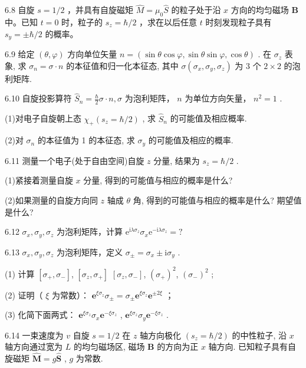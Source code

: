 6.8 自旋 $s = 1 / 2$ ，并具有自旋磁矩 $\hat{M} = \mu_0\hat{S}$ 的粒子处于沿 $x$ 方向的均匀磁场 $\pmb{B}$ 中。已知 $t = 0$ 时，粒子的 $s_z = \hbar / 2$ ，求在以后任意 $t$ 时刻发现粒子具有 $s_y = \pm \hbar / 2$ 的概率。
\vfill\newpage

6.9 给定 $(\theta, \varphi)$ 方向单位矢量 $n = (\sin \theta \cos \varphi, \sin \theta \sin \varphi, \cos \theta)$ . 在 $\sigma_z$ 表象, 求 $\sigma_n = \sigma \cdot n$ 的本征值和归一化本征态, 其中 $\sigma(\sigma_x, \sigma_y, \sigma_z)$ 为 3 个 $2 \times 2$ 的泡利矩阵.
\vfill\newpage

6.10 自旋投影算符 $\hat{S}_n = \frac{\hbar}{2}\sigma \cdot n, \sigma$ 为泡利矩阵， $n$ 为单位方向矢量， $n^2 = 1$ .

(1)对电子自旋朝上态 $\chi_{+}(s_{z} = \hbar /2)$ , 求 $\hat{S}_n$ 的可能值及相应概率. 

(2)对 $\sigma_{n}$ 的本征值为 1 的本征态, 求 $\sigma_{y}$ 的可能值及相应的概率.
\vfill\newpage

6.11 测量一个电子(处于自由空间)自旋 $z$ 分量, 结果为 $s_z = \hbar / 2$ . 

(1)紧接着测量自旋 $x$ 分量, 得到的可能值与相应的概率是什么? 

(2)如果测量的自旋方向同 $z$ 轴成 $\theta$ 角, 得到的可能值与相应的概率是什么? 期望值是什么?

\vfill\newpage

6.12 $\sigma_{x},\sigma_{y},\sigma_{z}$ 为泡利矩阵，计算 $\mathrm{e}^{\mathrm{i}\lambda \sigma_z}\sigma_x\mathrm{e}^{-\mathrm{i}\lambda \sigma_z} = ?$

\vfill\newpage

6.13 $\sigma_{x},\sigma_{y},\sigma_{z}$ 为泡利矩阵，定义 $\sigma_{\pm} = \sigma_{x}\pm \mathrm{i}\sigma_{y}$ .

(1) 计算 $[\sigma_+, \sigma_-]$, $[\sigma_z, \sigma_+]$ $\left[\sigma_z,\sigma_-\right]$, $(\sigma_+) ^2$, $(\sigma_-)^2$ ; 

(2) 证明（ $\xi$ 为常数）： $\mathbf{e}^{\xi \sigma_z}\sigma_{\pm} = \sigma_{\pm}\mathbf{e}^{\xi \sigma_z}\mathbf{e}^{\pm 2\xi}$ ；

(3) 化简下面两式： $\mathbf{e}^{\xi \sigma_z}\sigma_x\mathbf{e}^{-\xi \sigma_z}$ , $\mathbf{e}^{\xi \sigma_z}\sigma_y\mathbf{e}^{-\xi \sigma_z}$ .

\vfill\newpage

6.14 一束速度为 $v$ 自旋 $s = 1 / 2$ 在 $z$ 轴方向极化 $(s_z = \hbar / 2)$ 的中性粒子, 沿 $x$ 轴方向通过宽为 $L$ 的均匀磁场区, 磁场 $\pmb{B}$ 的方向为正 $x$ 轴方向. 已知粒子具有自旋磁矩 $\hat{\pmb{M}} = g\hat{\pmb{S}}$ , $g$ 为常数. 

